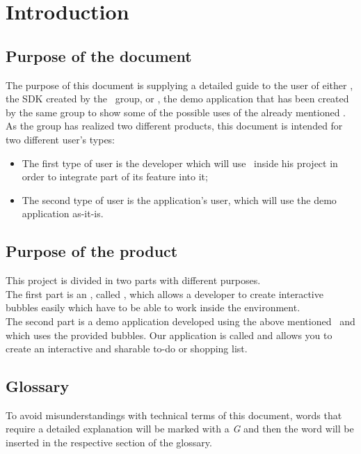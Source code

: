 \section{Introduction}

\subsection{Purpose of the document}
The purpose of this document is supplying a detailed guide to the user of either \progettoShort, the SDK created by the \gruppo\ group, or \app, the demo application that has been created by the same group to show some of the possible uses of the already mentioned . \\
As the group has realized two different products, this document is intended for two different user's types:
\begin{itemize}
	\item The first type of user is the developer which will use \progettoShort\ inside his  project in order to integrate part of its feature into it;
	\item The second type of user is the application's user, which will use the demo application as-it-is.
\end{itemize}

\subsection{Purpose of the product}
This project is divided in two parts with different purposes. \\
The first part is an , called \progettoShort, which allows a developer to create interactive bubbles easily which have to be able to work inside the  environment. \\
The second part is a demo application developed using the above mentioned \progettoShort\ and which uses the provided bubbles. Our application is called \app and allows you to create an interactive and sharable to-do or shopping list.

\subsection{Glossary}
To avoid misunderstandings with technical terms of this document, words that require a detailed explanation will be marked with a \textit{G} and then the word will be inserted in the respective section of the glossary.

\newpage